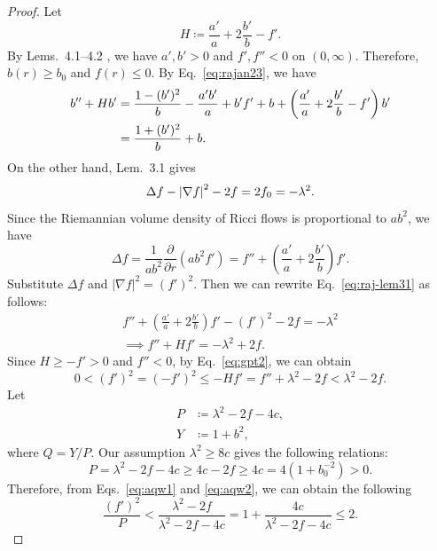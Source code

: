 \documentclass[11pt,letterpaper]{article}
\begin{document}
\begin{proof}
    Let 
    \begin{equation}
        H \coloneq \frac{a'}{a} + 2\frac{b'}{b} - f'.
    \end{equation}
    By Lems.~4.1--4.2 \cite{Rajan}, we have $a', b' > 0$ and $f', f'' < 0$ on $(0, \infty)$. Therefore, $b(r) \ge b_0$ and $f(r) \le 0$. By Eq.~\eqref{eq:rajan23}, we have
    \begin{align}
        b'' + Hb' &= \frac{1 - (b')^2}{b} - \frac{a'b'}{a} + b'f' + b + \left( \frac{a'}{a} + 2\frac{b'}{b} - f' \right) b' \notag \\ &= \frac{1 + (b')^2}{b} + b. \label{eq:gpt1}
    \end{align}
    On the other hand, Lem.~3.1 \cite{Rajan} gives
    \begin{equation} \label{eq:raj-lem31}
        \Delta f - \left\lvert \nabla f \right\rvert^2 - 2f = 2f_0 = -\lambda^2.
    \end{equation}
    Since the Riemannian volume density of Ricci flows is proportional to $ab^2$, we have
    \begin{equation}
        \Delta f = \frac{1}{ab^2} \frac{\partial}{\partial r} (ab^2 f') = f'' + \left( \frac{a'}{a} + 2\frac{b'}{b} \right) f'.
    \end{equation}
    Substitute $\Delta f$ and $|\nabla f|^2 = (f')^2$. Then we can rewrite Eq.~\eqref{eq:raj-lem31} as follows:
    \begin{gather}
        f'' + \left( \frac{a'}{a} + 2\frac{b'}{b} \right) f' - (f')^2 - 2f = -\lambda^2 \\
        \implies f'' + Hf' = -\lambda^2 + 2f. \label{eq:gpt2}
    \end{gather}
    Since $H \ge -f' > 0$ and $f'' < 0$, by Eq.~\eqref{eq:gpt2}, we can obtain
    \begin{equation} \label{eq:aqw1}
        0 < (f')^2 = (-f')^2 \le -Hf' = f'' + \lambda^2 - 2f < \lambda^2 - 2f.
    \end{equation}
    Let
    \begin{align}
        P &\coloneq \lambda^2 - 2f - 4c, \label{eq:qp} \\
        Y &\coloneq 1 + b^2, \label{eq:qy}
    \end{align}
    where $Q = Y/P$. Our assumption $\lambda^2 \ge 8c$ gives the following relations:
    \begin{equation} \label{eq:aqw2}
        P = \lambda^2 - 2f - 4c \ge 4c - 2f \ge 4c = 4 (1 + b_0^{-2}) > 0.
    \end{equation}
    Therefore, from Eqs.~\eqref{eq:aqw1} and \eqref{eq:aqw2}, we can obtain the following
    \begin{equation} \label{eq:vbound}
        \frac{(f')^2}P < \frac{\lambda^2 - 2f}{\lambda^2 - 2f - 4c} = 1 + \frac{4c}{\lambda^2 - 2f - 4c} \le 2.
    \end{equation}
    

\end{proof}
\end{document}
